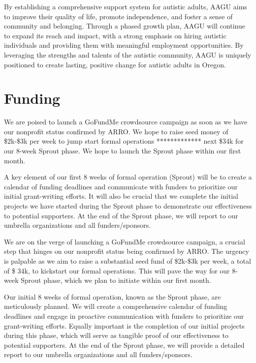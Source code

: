 \documentclass[
  letterpaper,
  DIV=11,
  numbers=noendperiod]{scrreprt}
\begin{document}
By establishing a comprehensive support system for autistic adults, AAGU
aims to improve their quality of life, promote independence, and foster
a sense of community and belonging. Through a phased growth plan, AAGU
will continue to expand its reach and impact, with a strong emphasis on
hiring autistic individuals and providing them with meaningful
employment opportunities. By leveraging the strengths and talents of the
autistic community, AAGU is uniquely positioned to create lasting,
positive change for autistic adults in Oregon.


\hypertarget{funding}{%
\chapter{Funding}\label{funding}}

We are poised to launch a GoFundMe crowdsource campaign as soon as we
have our nonprofit status confirmed by ARRO. We hope to raise seed money
of \$2k-\$3k per week to jump start formal operations ************* next
\$34k for our 8-week Sprout phase. We hope to launch the Sprout phase
within our first month.

A key element of our first 8 weeks of formal operation (Sprout) will be
to create a calendar of funding deadlines and communicate with funders
to prioritize our initial grant-writing efforts. It will also be crucial
that we complete the initial projects we have started during the Sprout
phase to demonstrate our effectiveness to potential supporters. At the
end of the Sprout phase, we will report to our umbrella organizations
and all funders/sponsors.

We are on the verge of launching a GoFundMe crowdsource campaign, a
crucial step that hinges on our nonprofit status being confirmed by
ARRO. The urgency is palpable as we aim to raise a substantial seed fund
of \$2k-\$3k per week, a total of \$ 34k, to kickstart our formal
operations. This will pave the way for our 8-week Sprout phase, which we
plan to initiate within our first month.

Our initial 8 weeks of formal operation, known as the Sprout phase, are
meticulously planned. We will create a comprehensive calendar of funding
deadlines and engage in proactive communication with funders to
prioritize our grant-writing efforts. Equally important is the
completion of our initial projects during this phase, which will serve
as tangible proof of our effectiveness to potential supporters. At the
end of the Sprout phase, we will provide a detailed report to our
umbrella organizations and all funders/sponsors.
\end{document}
